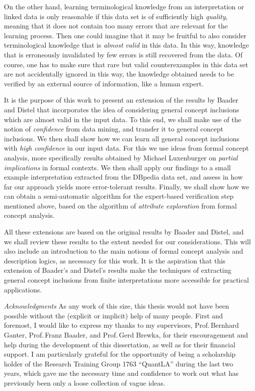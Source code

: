 On the other hand, learning terminological knowledge from an interpretation or linked data
is only reasonable if this data set is of sufficiently high \emph{quality}, meaning that
it does not contain too many errors that are relevant for the learning process.  Then one
could imagine that it may be fruitful to also consider terminological knowledge that is
\emph{almost valid} in this data.  In this way, knowledge that is erroneously invalidated
by few errors is still recovered from the data.  Of course, one has to make sure that rare
but valid counterexamples in this data set are not accidentally ignored in this way, \ie
the knowledge obtained needs to be verified by an external source of information, like a
human expert.

It is the purpose of this work to present an extension of the results by Baader and Distel
that incorporates the idea of considering general concept inclusions which are almost
valid in the input data.  To this end, we shall make use of the notion of
\emph{confidence} from data mining, and transfer it to general concept inclusions.  We
then shall show how we can learn all general concept inclusions with \emph{high
  confidence} in our input data.  For this we use ideas from formal concept analysis, more
specifically results obtained by Michael Luxenburger on \emph{partial implications} in
formal contexts.  We then shall apply our findings to a small example interpretation
extracted from the DBpedia data set, and assess in how far our approach yields more
error-tolerant results.  Finally, we shall show how we can obtain a semi-automatic
algorithm for the expert-based verification step mentioned above, based on the algorithm
of \emph{attribute exploration} from formal concept analysis.

All these extensions are based on the original results by Baader and Distel, and we shall
review these results to the extent needed for our considerations.  This will also include
an introduction to the main notions of formal concept analysis and description logics, as
necessary for this work.  It is the aspiration that this extension of Baader's and
Distel's results make the techniques of extracting general concept inclusions from finite
interpretations more accessible for practical applications.

\bigskip\noindent%
\textit{Acknowledgments}\hspace*{2em} As any work of this size, this thesis would not have
been possible without the (explicit or implicit) help of many people.  First and foremost,
I would like to express my thanks to my supervisors, Prof.\,Bernhard Ganter, Prof.\,Franz
Baader, and Prof.\,Gerd Brewka, for their encouragement and help during the development of
this dissertation, as well as for their financial support.  I am particularly grateful for
the opportunity of being a scholarship holder of the Research Training Group 1763
\enquote{QuantLA} during the last two years, which gave me the necessary time and
confidence to work out what has previously been only a loose collection of vague ideas.

